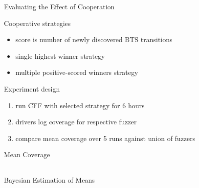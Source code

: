 \documentclass[\HandoutMode,table]{beamer}
\newcommand\figwidth\textwidth
\begin{document}
\begin{frame}{Evaluating the Effect of Cooperation}
    \begin{block}{Cooperative strategies}
        \begin{itemize}
            \item{} score is number of newly discovered BTS transitions
            \item{} single highest winner strategy
            \item{} multiple positive-scored winners strategy
        \end{itemize}
    \end{block}
    \begin{block}{Experiment design}
        \begin{enumerate}
            \item{} run CFF with selected strategy for 6 hours
            \item{} drivers log coverage for respective fuzzer
            \item{} compare mean coverage over 5 runs against union of fuzzers
        \end{enumerate}
    \end{block}
\end{frame}

\begin{frame}{Mean Coverage}
    \begin{table}
        \begin{tabular}{l c c c}
            
        \end{tabular}
    \end{table}
\end{frame}

\begin{frame}{Bayesian Estimation of Means}
    \renewcommand\figwidth{.28\textwidth}
    \setcounter{subfigure}{0}
    \begin{figure}
        \begin{adjustbox}{center}
            \hspace{-.05\textwidth}
            \hspace{-.05\textwidth}
            \hspace{-.05\textwidth}
        \end{adjustbox}
    \end{figure}
\end{frame}
\end{document}

